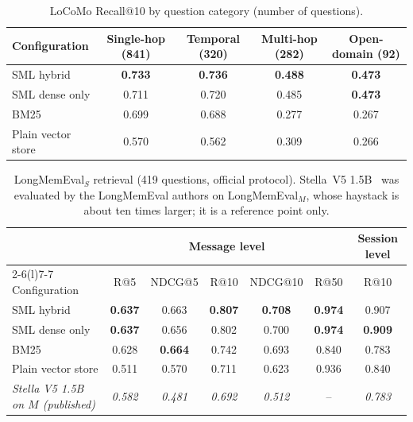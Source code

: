 \documentclass[11pt,a4paper]{article}
\theoremstyle{remark}
\newcommand{\sys}{SML}
\newcommand{\best}[1]{\textbf{#1}}
\begin{document}
\begin{table}[htbp]
\centering
\small
\caption{LoCoMo Recall@10 by question category (number of questions).}
\label{tab:locomocat}
\begin{tabular}{@{}lcccc@{}}
\toprule
Configuration & Single-hop (841) & Temporal (320) & Multi-hop (282) & Open-domain (92) \\
\midrule
\sys{} hybrid & \best{0.733} & \best{0.736} & \best{0.488} & \best{0.473} \\
\sys{} dense only & 0.711 & 0.720 & 0.485 & \best{0.473} \\
BM25 & 0.699 & 0.688 & 0.277 & 0.267 \\
Plain vector store & 0.570 & 0.562 & 0.309 & 0.266 \\
\bottomrule
\end{tabular}
\end{table}

\begin{table}[htbp]
\centering
\small
\caption{LongMemEval$_S$ retrieval (419 questions, official protocol). Stella~V5 1.5B~\cite{stella2024} was evaluated by the
LongMemEval authors on LongMemEval$_M$, whose haystack is about ten times larger; it is a reference point only.}
\label{tab:lme}
\begin{tabular}{@{}lcccccc@{}}
\toprule
 & \multicolumn{5}{c}{Message level} & Session level \\
\cmidrule(lr){2-6}\cmidrule(l){7-7}
Configuration & R@5 & NDCG@5 & R@10 & NDCG@10 & R@50 & R@10 \\
\midrule
\sys{} hybrid & \best{0.637} & 0.663 & \best{0.807} & \best{0.708} & \best{0.974} & 0.907 \\
\sys{} dense only & \best{0.637} & 0.656 & 0.802 & 0.700 & \best{0.974} & \best{0.909} \\
BM25 & 0.628 & \best{0.664} & 0.742 & 0.693 & 0.840 & 0.783 \\
Plain vector store & 0.511 & 0.570 & 0.711 & 0.623 & 0.936 & 0.840 \\
\midrule
\textit{Stella V5 1.5B on $M$ (published)} & \textit{0.582} & \textit{0.481} & \textit{0.692} & \textit{0.512} & -- & \textit{0.783} \\
\bottomrule
\end{tabular}
\end{table}
\end{document}

